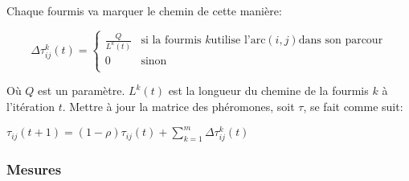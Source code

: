 \documentclass[a4paper, 11pt]{article}
\begin{document}
Chaque fourmis va marquer le chemin de cette manière:
 \begin{center}
  \begin{displaymath}
    \Delta\tau_{ij}^k(t) = 
    \left\lbrace
      \begin{array}{ll}
	\frac{Q}{L^k(t)} & \text{si la fourmis } k \text{utilise l'arc} (i,j) \text{dans son parcour}\\
	0 & \text{sinon } \\
      \end{array}
    \right.
\end{displaymath}
 \end{center}

 Où $Q$ est un paramètre. $L^k(t)$ est la longueur du chemine de la fourmis $k$ à l'itération $t$.
Mettre à jour la matrice des phéromones, soit $\tau$, se fait comme suit:
\begin{center}
 \begin{math}
  \tau_{ij}(t+1) = (1-\rho)\tau_{ij}(t) + \sum\limits_{k=1}^{m} \Delta\tau_{ij}^k(t)
 \end{math}
\end{center}

\subsubsection{Mesures}
\end{document}
